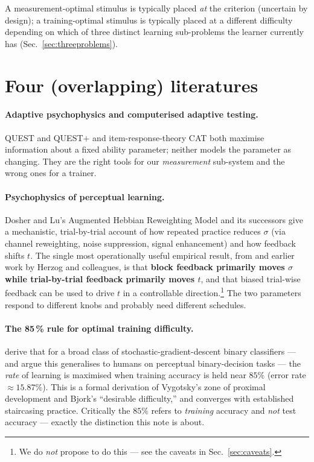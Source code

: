 \documentclass[11pt]{article}
\begin{document}
A measurement-optimal stimulus is typically placed \emph{at} the
criterion (uncertain by design); a training-optimal stimulus is
typically placed at a different difficulty depending on which of three
distinct learning sub-problems the learner currently has
(Sec.~\ref{sec:threeproblems}).

\section{Four (overlapping) literatures}
\label{sec:lit}

\paragraph{Adaptive psychophysics and computerised adaptive testing.}
QUEST and QUEST$+$ \citep{watson1983quest,watson2017questplus} and
item-response-theory CAT both maximise information about a fixed
ability parameter; neither models the parameter as changing. They are
the right tools for our \emph{measurement} sub-system and the wrong
ones for a trainer.

\paragraph{Psychophysics of perceptual learning.}
Dosher and Lu's Augmented Hebbian Reweighting Model and its successors
give a mechanistic, trial-by-trial account of how repeated practice
reduces $\sigma$ (via channel reweighting, noise suppression, signal
enhancement) and how feedback shifts $t$. The single most
operationally useful empirical result, from
\citet{aberg2012feedback} and earlier work by Herzog and colleagues,
is that \textbf{block feedback primarily moves $\sigma$ while
trial-by-trial feedback primarily moves $t$}, and that biased
trial-wise feedback can be used to drive $t$ in a controllable
direction.\footnote{We do \emph{not} propose to do this — see the
caveats in Sec.~\ref{sec:caveats}.} The two parameters respond to
different knobs and probably need different schedules.

\paragraph{The 85\,\% rule for optimal training difficulty.}
\citet{wilson202085percent} derive that for a broad class of
stochastic-gradient-descent binary classifiers — and argue this
generalises to humans on perceptual binary-decision tasks — the
\emph{rate} of learning is maximised when training accuracy is held
near $85\%$ (error rate $\approx 15.87\%$). This is a formal derivation
of Vygotsky's zone of proximal development and Bjork's
``desirable difficulty,'' and converges with established staircasing
practice. Critically the $85\%$ refers to \emph{training} accuracy and
\emph{not} test accuracy — exactly the distinction this note is
about.
\end{document}
